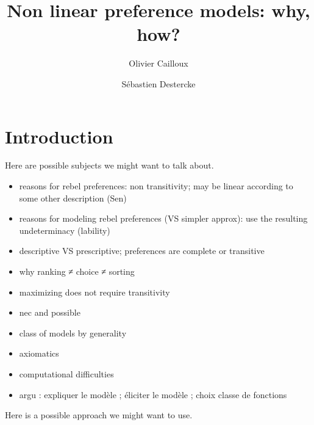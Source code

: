 \documentclass[french, english]{llncs}
\begin{document}
\title{Non linear preference models: why, how?}
\author{Olivier Cailloux \and Sébastien Destercke}
\maketitle


\section{Introduction}
Here are possible subjects we might want to talk about.
\begin{itemize}
	\item reasons for rebel preferences: non transitivity; may be linear according to some other description (Sen)
	\item reasons for modeling rebel preferences (VS simpler approx): use the resulting undeterminacy (lability)
	\item descriptive VS prescriptive; preferences are complete or transitive
	\item why ranking ≠ choice ≠ sorting
	\item maximizing does not require transitivity
	\item nec and possible
	\item class of models by generality
	\item axiomatics
	\item computational difficulties
	\item argu : expliquer le modèle ; éliciter le modèle ; choix classe de fonctions
\end{itemize}

Here is a possible approach we might want to use.
\end{document}
